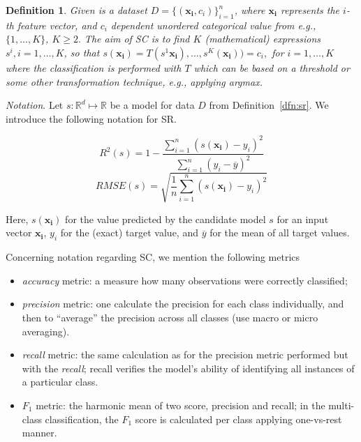 \documentclass{bmcart}
\newtheorem{definition}{Definition}
\begin{document}
\begin{definition}\label{dfn:sc}
	Given is a dataset $D = \{(\mathbf{x_i}, c_i)\}_{i=1}^n$, where $\mathbf{x_i}$ represents the $i$-th feature vector, and $c_i$  dependent unordered categorical
	 value from e.g., $\{1, \ldots, K  \} $, $K\geq 2. $ The aim of SC is to find $K$ (mathematical) expressions $s^i, i=1, \ldots, K$, so that $s(\mathbf{x_i}) = T( s^1\mathbf{x_i}), \ldots, s^K(\mathbf{x_i})  ) = c_i,$ for $i=1, \ldots, K$ where the classification is performed with $T$ which can be based on a threshold  or some other transformation technique, e.g., applying \textrm{argmax}. 
  \end{definition}
 
 
\emph{Notation}. Let $s \colon \mathbb{R}^d \mapsto \mathbb{R}$ be a model for data $D$ from Definition~\ref{dfn:sr}.  We introduce the following notation for SR. 
 
\begin{equation}
		R^2(s) = 1- \frac{ \sum_{i=1}^{n} \left( s(\mathbf{x_i}) - y_i \right)^2  }{ \sum_{i=1}^{n} \left( y_{i}  - \overline{y} \right)^2  }
	\end{equation}
	\begin{equation}
		RMSE(s) = \sqrt {\frac{1}{n} \sum_{i=1}^{n} (s(\mathbf{x_i}) - y_{i})^2}
	\end{equation}
	
 Here, $s(\mathbf{x_i})$ for the value predicted by the candidate model $s$ for an input vector $\mathbf{x_i}$, $y_{i}$ for the (exact) target value, and $\overline{y}$ for the mean of all target values.
 
Concerning notation regarding SC, we mention the following metrics %
\begin{itemize}
    \item \emph{accuracy} metric: a measure how many observations were correctly classified;
    \item   \emph{precision} metric: one calculate the precision for each class individually, and then to ``average'' the precision  across all classes (use macro or micro averaging).
    \item  \emph{recall} metric: the same calculation as for the precision metric performed but with the \emph{recall}; recall verifies the model's ability of identifying all instances of a particular class. 
    \item $F_1$ metric: the harmonic mean of two score, precision and recall; in the multi-class classification, the $F_1$ score is calculated per class applying one-vs-rest manner. 
       
\end{itemize}
 
\end{document}
